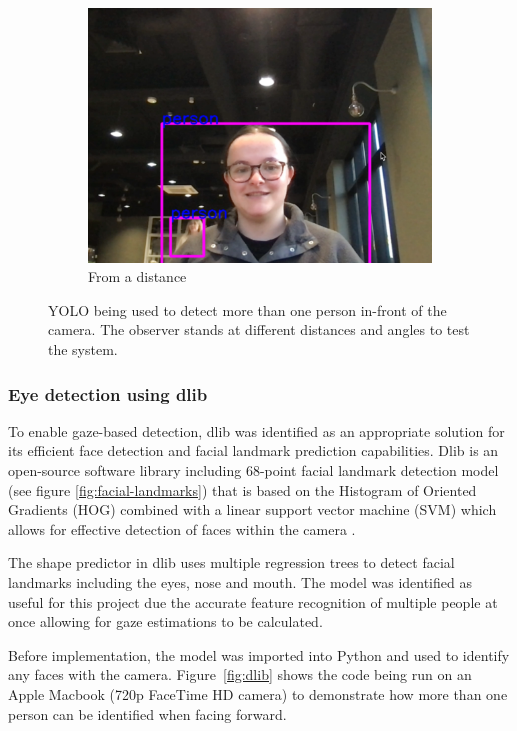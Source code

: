 \documentclass[12pt]{article}
\theoremstyle{plain}
\theoremstyle{definition}
\begin{document}
\begin{figure}[h!]
\begin{subfigure}[b]{0.3\textwidth}
         \includegraphics[width=\textwidth]{img/fig1-img3.png}
         \caption{From a distance}
         \label{fig:c}
     \end{subfigure}
        \caption{YOLO being used to detect more than one person in-front of the camera. The observer stands at different distances and angles to test the system.}
        \label{fig:yolo}
\end{figure}

\subsubsection{Eye detection using dlib}
\label{dlib}

To enable gaze-based detection, dlib was identified as an appropriate solution for its efficient face detection and facial landmark prediction capabilities. Dlib is an open-source software library \cite{noauthor_dlib_nodate} including 68-point facial landmark detection model (see figure \ref{fig:facial-landmarks}) that is based on the Histogram of Oriented Gradients (HOG) combined with a linear support vector machine (SVM) which allows for effective detection of faces within the camera \cite{kazemi_one_2014}.

The shape predictor in dlib uses multiple regression trees to detect facial landmarks including the eyes, nose and mouth. The model was identified as useful for this project due the accurate feature recognition of multiple people at once allowing for gaze estimations to be calculated.

Before implementation, the model was imported into Python and used to identify any faces with the camera. Figure~\ref{fig:dlib} shows the code being run on an Apple Macbook (720p FaceTime HD camera) to demonstrate how more than one person can be identified when facing forward.
\end{document}
